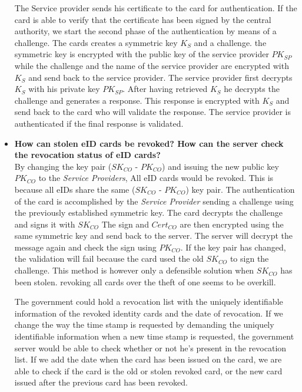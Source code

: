 \documentclass[12pt]{report}
\begin{document}
\begin{itemize}
The Service provider sends his certificate to the card for authentication. If the card is able to verify that the certificate has been signed by the central authority, we start the second phase of the authentication by means of a challenge. The cards creates a symmetric key $K_S$ and a challenge. the symmetric key is encrypted with the public key of the service provider $PK_{SP}$ while the challenge and the name of the service provider are encrypted with $K_S$  and send back to the service provider. The service provider first decrypts $K_S$ with his private key $PK_{SP}$. After having retrieved $K_S$ he decrypts the challenge and generates a response. This response is encrypted with $K_S$ and send back to the card who will validate the response. The service provider is authenticated if the final response is validated.

\item \textbf{How can stolen eID cards be revoked? How can the server check the revocation status of eID cards?}\\
By changing the key pair ($SK_{CO}$ - $PK_{CO}$) and issuing the new public key $PK_{CO}$ to the \textit{Service Providers}, All eID cards would be revoked. This is because all eIDs share the same ($SK_{CO}$ - $PK_{CO}$) key pair. The authentication of the card is accomplished by the \textit{Service Provider} sending a challenge using the previously established symmetric key. The card decrypts the challenge and signs it with $SK_{CO}$ The sign and $Cert_{CO}$ are then encrypted using the same symmetric key and send back to the server. The server will decrypt the message again and check the sign using $PK_{CO}$. If the key pair has changed, the validation will fail because the card used the old $SK_{CO}$ to sign the challenge. This method is however only a defensible solution when $SK_{CO}$ has been stolen. revoking all cards over the theft of one seems to be overkill.

The government could hold a revocation list with the uniquely identifiable information of the revoked identity cards and the date of revocation. If we change the way the time stamp is requested by demanding the uniquely identifiable information when a new time stamp is requested, the government server would be able to check whether or not he's present in the revocation list. If we add the date when the card has been issued on the card, we are able to check if the card is the old or stolen revoked card, or the new card issued after the previous card has been revoked.


\end{itemize}
\end{document}
